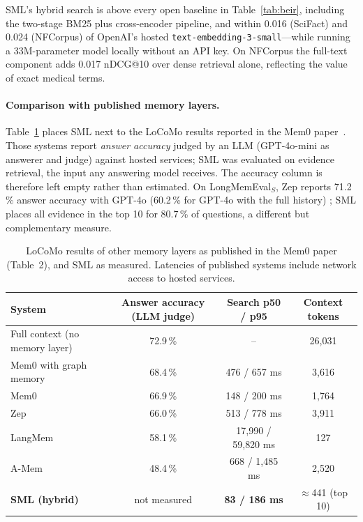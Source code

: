 \documentclass[11pt,a4paper]{article}
\newcommand{\sys}{SML}
\newcommand{\best}[1]{\textbf{#1}}
\begin{document}
\sys{}'s hybrid search is above every open baseline in Table~\ref{tab:beir}, including the two-stage BM25 plus
cross-encoder pipeline, and within 0.016 (SciFact) and 0.024 (NFCorpus) of OpenAI's hosted
\texttt{text-embedding-3-small}---while running a 33M-parameter model locally without an API key. On NFCorpus
the full-text component adds 0.017 nDCG@10 over dense retrieval alone, reflecting the value of exact medical
terms.

\paragraph{Comparison with published memory layers.} Table~\ref{tab:mem0} places \sys{} next to the LoCoMo
results reported in the Mem0 paper~\cite{chhikara2025mem0}. Those systems report \emph{answer accuracy} judged by
an LLM (GPT-4o-mini as answerer and judge) against hosted services; \sys{} was evaluated on evidence retrieval,
the input any answering model receives. The accuracy column is therefore left empty rather than estimated.
On LongMemEval$_S$, Zep reports 71.2\,\% answer accuracy with GPT-4o (60.2\,\% for GPT-4o with the full history)
\cite{rasmussen2025zep}; \sys{} places all evidence in the top 10 for 80.7\,\% of questions, a different but
complementary measure.

\begin{table}[htbp]
\centering
\small
\caption{LoCoMo results of other memory layers as published in the Mem0 paper (Table~2), and \sys{} as
measured. Latencies of published systems include network access to hosted services.}
\label{tab:mem0}
\setlength{\tabcolsep}{5pt}
\begin{tabular}{@{}lccc@{}}
\toprule
System & Answer accuracy (LLM judge) & Search p50 / p95 & Context tokens \\
\midrule
Full context (no memory layer) & 72.9\,\% & -- & 26{,}031 \\
Mem0 with graph memory & 68.4\,\% & 476 / 657 ms & 3{,}616 \\
Mem0 & 66.9\,\% & 148 / 200 ms & 1{,}764 \\
Zep & 66.0\,\% & 513 / 778 ms & 3{,}911 \\
LangMem & 58.1\,\% & 17{,}990 / 59{,}820 ms & 127 \\
A-Mem & 48.4\,\% & 668 / 1{,}485 ms & 2{,}520 \\
\midrule
\textbf{\sys{} (hybrid)} & not measured & \best{83 / 186 ms} & $\approx$441 (top 10) \\
\bottomrule
\end{tabular}
\end{table}
\end{document}
